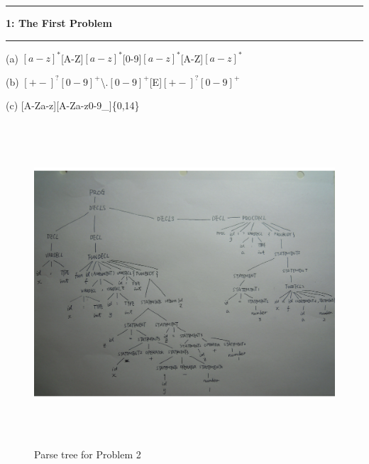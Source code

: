 \documentclass[11pt]{article}
\newcommand\question[2]{\vspace{.25in}\hrule\textbf{#1: #2}\vspace{.5em}\hrule\vspace{.10in}}
\newcommand\correctness{\vspace{.10in}\textbf{Correctness: }}
\newcommand\runtime{\vspace{.10in}\textbf{Running time: }}
\begin{document}
\raggedright
\newcommand\NAME{Min Guo}  %
\newcommand\ANDREWID{N10971010}     %
\newcommand\HWNUM{1}              %


\question{1}{The First Problem} 

(a) $[a-z]^{*}$[A-Z]$[a-z]^{*}$[0-9]$[a-z]^{*}$[A-Z]$[a-z]^{*}$

(b)   $[+-]^{?}$$[0-9]^{+}$\textbackslash.$[0-9]^{+}$[E]$[+-]^{?}$$[0-9]^{+}$

(c)   [A-Za-z][A-Za-z0-9\_]\{0,14\}



\begin{figure}[t]
\caption{Parse tree for Problem 2}
\includegraphics[width=16cm, height=12cm]{parse_tree}
\centering
\end{figure}
\end{document}
